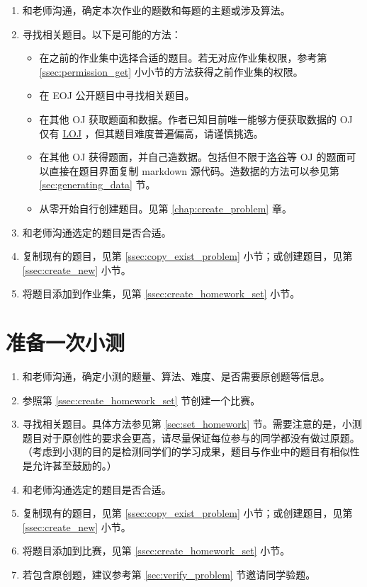 \documentclass[oneside]{book}
\begin{document}
\begin{enumerate}
  \item 和老师沟通，确定本次作业的题数和每题的主题或涉及算法。
  \item 寻找相关题目。以下是可能的方法：
  \begin{itemize}
    \item 在之前的作业集中选择合适的题目。若无对应作业集权限，参考第 \ref{ssec:permission_get} 小小节的方法获得之前作业集的权限。
    \item 在 EOJ 公开题目中寻找相关题目。
    \item 在其他 OJ 获取题面和数据。作者已知目前唯一能够方便获取数据的 OJ 仅有 \href{https://loj.ac/}{LOJ} ，但其题目难度普遍偏高，请谨慎挑选。
    \item 在其他 OJ 获得题面，并自己造数据。包括但不限于\href{https://www.luogu.com.cn/}{洛谷}等 OJ 的题面可以直接在题目界面复制 markdown 源代码。造数据的方法可以参见第 \ref{sec:generating_data} 节。
    \item 从零开始自行创建题目。见第 \ref{chap:create_problem} 章。
  \end{itemize}
  \item 和老师沟通选定的题目是否合适。
  \item 复制现有的题目，见第 \ref{ssec:copy_exist_problem} 小节；或创建题目，见第 \ref{ssec:create_new} 小节。
  \item 将题目添加到作业集，见第 \ref{ssec:create_homework_set} 小节。
\end{enumerate}

\section{准备一次小测}

\begin{enumerate}
  \item 和老师沟通，确定小测的题量、算法、难度、是否需要原创题等信息。
  \item 参照第 \ref{ssec:create_homework_set} 节创建一个比赛。
  \item 寻找相关题目。具体方法参见第 \ref{sec:set_homework} 节。需要注意的是，小测题目对于原创性的要求会更高，请尽量保证每位参与的同学都没有做过原题。（考虑到小测的目的是检测同学们的学习成果，题目与作业中的题目有相似性是允许甚至鼓励的。）
  \item 和老师沟通选定的题目是否合适。
  \item 复制现有的题目，见第 \ref{ssec:copy_exist_problem} 小节；或创建题目，见第 \ref{ssec:create_new} 小节。
  \item 将题目添加到比赛，见第 \ref{ssec:create_homework_set} 小节。
  \item 若包含原创题，建议参考第 \ref{sec:verify_problem} 节邀请同学验题。
\end{enumerate}
\end{document}
